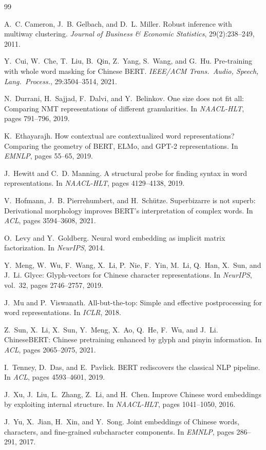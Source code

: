 \documentclass[11pt,a4paper,twocolumn]{article}
\begin{document}
\balance
\begin{thebibliography}{99}
\footnotesize
\setlength{\itemsep}{2pt}
\setlength{\parsep}{0pt}

A.~C. Cameron, J.~B. Gelbach, and D.~L. Miller.
Robust inference with multiway clustering.
\emph{Journal of Business \& Economic Statistics}, 29(2):238--249, 2011.

Y.~Cui, W.~Che, T.~Liu, B.~Qin, Z.~Yang, S.~Wang, and G.~Hu.
Pre-training with whole word masking for Chinese BERT.
\emph{IEEE/ACM Trans.\ Audio, Speech, Lang.\ Process.}, 29:3504--3514, 2021.

N.~Durrani, H.~Sajjad, F.~Dalvi, and Y.~Belinkov.
One size does not fit all: Comparing NMT representations of different
granularities.
In \emph{NAACL-HLT}, pages 791--796, 2019.

K.~Ethayarajh.
How contextual are contextualized word representations? Comparing the
geometry of BERT, ELMo, and GPT-2 representations.
In \emph{EMNLP}, pages 55--65, 2019.

J.~Hewitt and C.~D. Manning.
A structural probe for finding syntax in word representations.
In \emph{NAACL-HLT}, pages 4129--4138, 2019.

V.~Hofmann, J.~B. Pierrehumbert, and H.~Sch\"utze.
Superbizarre is not superb: Derivational morphology improves BERT's
interpretation of complex words.
In \emph{ACL}, pages 3594--3608, 2021.

O.~Levy and Y.~Goldberg.
Neural word embedding as implicit matrix factorization.
In \emph{NeurIPS}, 2014.

Y.~Meng, W.~Wu, F.~Wang, X.~Li, P.~Nie, F.~Yin, M.~Li, Q.~Han, X.~Sun,
and J.~Li.
Glyce: Glyph-vectors for Chinese character representations.
In \emph{NeurIPS}, vol.~32, pages 2746--2757, 2019.

J.~Mu and P.~Viswanath.
All-but-the-top: Simple and effective postprocessing for word
representations.
In \emph{ICLR}, 2018.

Z.~Sun, X.~Li, X.~Sun, Y.~Meng, X.~Ao, Q.~He, F.~Wu, and J.~Li.
ChineseBERT: Chinese pretraining enhanced by glyph and pinyin
information.
In \emph{ACL}, pages 2065--2075, 2021.

I.~Tenney, D.~Das, and E.~Pavlick.
BERT rediscovers the classical NLP pipeline.
In \emph{ACL}, pages 4593--4601, 2019.

J.~Xu, J.~Liu, L.~Zhang, Z.~Li, and H.~Chen.
Improve Chinese word embeddings by exploiting internal structure.
In \emph{NAACL-HLT}, pages 1041--1050, 2016.

J.~Yu, X.~Jian, H.~Xin, and Y.~Song.
Joint embeddings of Chinese words, characters, and fine-grained
subcharacter components.
In \emph{EMNLP}, pages 286--291, 2017.

\end{thebibliography}
\end{document}
